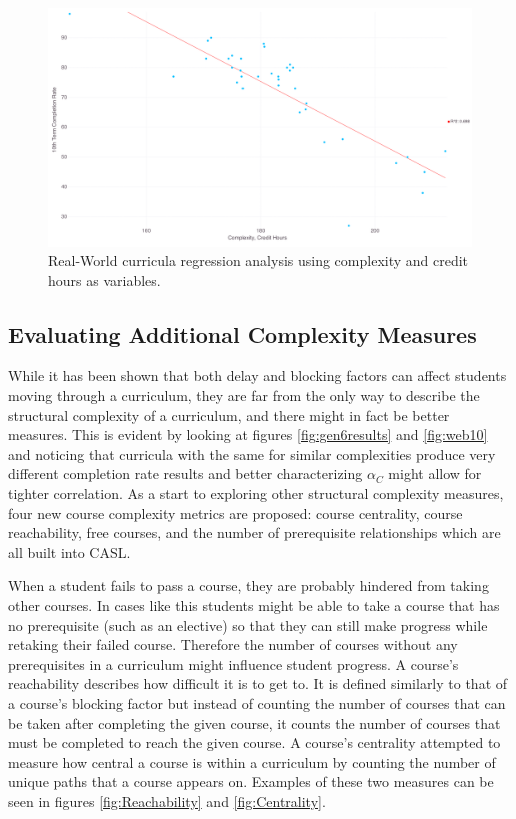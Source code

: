 \documentclass[botnum, fleqn]{unmeethesis}
\begin{document}
    \begin{figure}[h!]
      \centerline{\includegraphics[scale=0.25]{./figures/gradRate10_v_complexity_credits_80.png}}
      \caption{Real-World curricula regression analysis using complexity and credit hours as variables.} 
      \label{fig:wbcompch}
    \end{figure}

    \subsection{Evaluating Additional Complexity Measures}
      While it has been shown that both delay and blocking factors can affect students moving through a curriculum, they are far from the only way to describe the structural complexity of a curriculum, and there might in fact be better measures. This is evident by looking at figures \ref{fig:gen6results} and \ref{fig:web10} and noticing that curricula with the same for similar complexities produce very different completion rate results and better characterizing $\alpha_C$ might allow for tighter correlation. As a start to exploring other structural complexity measures, four new course complexity metrics are proposed: course centrality, course reachability, free courses, and the number of prerequisite relationships which are all built into CASL.

      When a student fails to pass a course, they are probably hindered from taking other courses. In cases like this students might be able to take a course that has no prerequisite (such as an elective) so that they can still make progress while retaking their failed course. Therefore the number of courses without any prerequisites in a curriculum might influence student progress. A course's reachability describes how difficult it is to get to. It is defined similarly to that of a course's blocking factor but instead of counting the number of courses that can be taken after completing the given course, it counts the number of courses that must be completed to reach the given course. A course's centrality attempted to measure how central a course is within a curriculum by counting the number of unique paths that a course appears on. Examples of these two measures can be seen in figures \ref{fig:Reachability} and \ref{fig:Centrality}.
\end{document}
